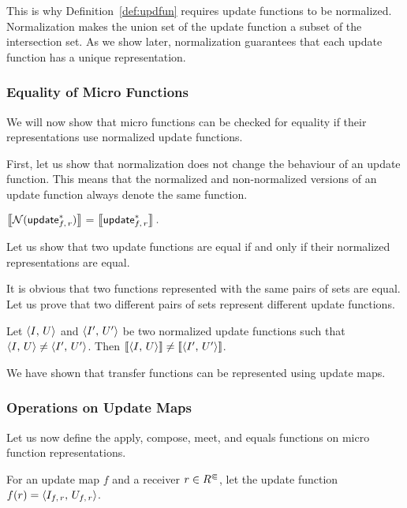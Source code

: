 This is why Definition~\ref{def:updfun} requires update functions to be normalized. Normalization makes the union set of the update function a subset of the intersection set.
As we show later, normalization guarantees that each update function has a unique representation.

\subsubsection{Equality of Micro Functions}\label{sec:equality}
We will now show that micro functions can be checked for equality if their representations use normalized update functions.

First, let us show that normalization does not change the behaviour of an update function. This means that the normalized and non-normalized versions of an update function always denote the same function.
   
\begin{lemma}\label{lem:normeq}
    $\left\llbracket\mathcal N(\textsf{update}_{f,\,r}^*)\right\rrbracket=\left\llbracket\textsf{update}_{f,\,r}^*\right\rrbracket.$
\end{lemma}


Let us show that two update functions are equal if and only if their normalized representations are equal.

It is obvious that two functions represented with the same pairs of sets are equal. Let us prove that two different pairs of sets represent different update functions.

\begin{lemma}\label{lem:normuneq}
    Let $\left\langle I,\,U\right\rangle$ and $\left\langle I',\,U'\right\rangle$ be two normalized update functions such that $\left\langle I,\,U\right\rangle\ne\left\langle I',\,U'\right\rangle$. Then $\left\llbracket\left\langle I,\,U\right\rangle\right\rrbracket\ne\left\llbracket\left\langle I',\,U'\right\rangle\right\rrbracket$.
\end{lemma}

We have shown that transfer functions can be represented using update maps. 

\subsubsection{Operations on Update Maps}\label{sec:opsTransRep}

Let us now define the apply, compose, meet, and equals functions on micro function representations.

For an update map $f$ and  a receiver $r\in {R^\Subset}$, let the update function $f(r)=\left\langle I_{f,\,r},\,U_{f,\,r}\right\rangle$.

